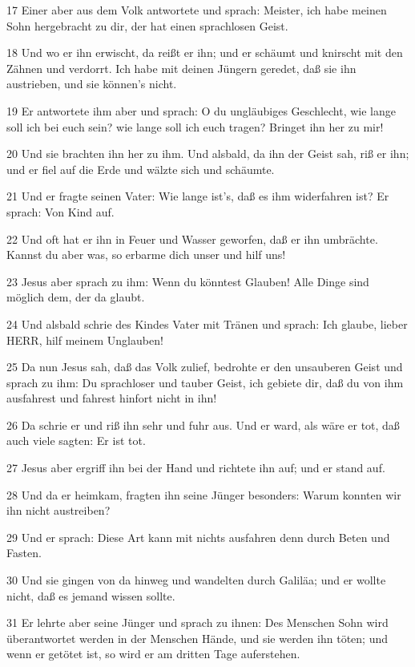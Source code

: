 \par 17 Einer aber aus dem Volk antwortete und sprach: Meister, ich habe meinen Sohn hergebracht zu dir, der hat einen sprachlosen Geist.
\par 18 Und wo er ihn erwischt, da reißt er ihn; und er schäumt und knirscht mit den Zähnen und verdorrt. Ich habe mit deinen Jüngern geredet, daß sie ihn austrieben, und sie können's nicht.
\par 19 Er antwortete ihm aber und sprach: O du ungläubiges Geschlecht, wie lange soll ich bei euch sein? wie lange soll ich euch tragen? Bringet ihn her zu mir!
\par 20 Und sie brachten ihn her zu ihm. Und alsbald, da ihn der Geist sah, riß er ihn; und er fiel auf die Erde und wälzte sich und schäumte.
\par 21 Und er fragte seinen Vater: Wie lange ist's, daß es ihm widerfahren ist? Er sprach: Von Kind auf.
\par 22 Und oft hat er ihn in Feuer und Wasser geworfen, daß er ihn umbrächte. Kannst du aber was, so erbarme dich unser und hilf uns!
\par 23 Jesus aber sprach zu ihm: Wenn du könntest Glauben! Alle Dinge sind möglich dem, der da glaubt.
\par 24 Und alsbald schrie des Kindes Vater mit Tränen und sprach: Ich glaube, lieber HERR, hilf meinem Unglauben!
\par 25 Da nun Jesus sah, daß das Volk zulief, bedrohte er den unsauberen Geist und sprach zu ihm: Du sprachloser und tauber Geist, ich gebiete dir, daß du von ihm ausfahrest und fahrest hinfort nicht in ihn!
\par 26 Da schrie er und riß ihn sehr und fuhr aus. Und er ward, als wäre er tot, daß auch viele sagten: Er ist tot.
\par 27 Jesus aber ergriff ihn bei der Hand und richtete ihn auf; und er stand auf.
\par 28 Und da er heimkam, fragten ihn seine Jünger besonders: Warum konnten wir ihn nicht austreiben?
\par 29 Und er sprach: Diese Art kann mit nichts ausfahren denn durch Beten und Fasten.
\par 30 Und sie gingen von da hinweg und wandelten durch Galiläa; und er wollte nicht, daß es jemand wissen sollte.
\par 31 Er lehrte aber seine Jünger und sprach zu ihnen: Des Menschen Sohn wird überantwortet werden in der Menschen Hände, und sie werden ihn töten; und wenn er getötet ist, so wird er am dritten Tage auferstehen.

